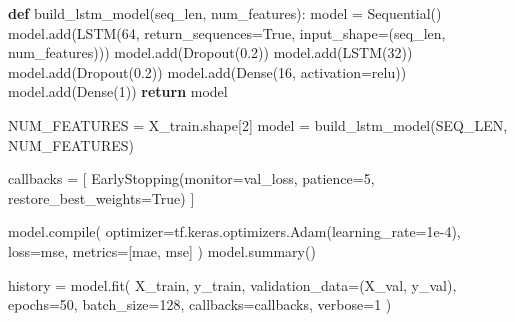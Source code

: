 \documentclass[
  letterpaper,
  DIV=11,
  numbers=noendperiod]{scrartcl}
\newenvironment{Shaded}{\begin{snugshade}}{\end{snugshade}}
\newcommand{\BuiltInTok}[1]{\textcolor[rgb]{0.00,0.23,0.31}{#1}}
\newcommand{\ControlFlowTok}[1]{\textcolor[rgb]{0.00,0.23,0.31}{\textbf{#1}}}
\newcommand{\DecValTok}[1]{\textcolor[rgb]{0.68,0.00,0.00}{#1}}
\newcommand{\FloatTok}[1]{\textcolor[rgb]{0.68,0.00,0.00}{#1}}
\newcommand{\KeywordTok}[1]{\textcolor[rgb]{0.00,0.23,0.31}{\textbf{#1}}}
\newcommand{\NormalTok}[1]{\textcolor[rgb]{0.00,0.23,0.31}{#1}}
\newcommand{\OperatorTok}[1]{\textcolor[rgb]{0.37,0.37,0.37}{#1}}
\newcommand{\StringTok}[1]{\textcolor[rgb]{0.13,0.47,0.30}{#1}}
\newcommand{\VariableTok}[1]{\textcolor[rgb]{0.07,0.07,0.07}{#1}}
\begin{document}
\begin{Shaded}
\begin{Highlighting}[]
\KeywordTok{def}\NormalTok{ build\_lstm\_model(seq\_len, num\_features):}
\NormalTok{    model }\OperatorTok{=}\NormalTok{ Sequential()}
\NormalTok{    model.add(LSTM(}\DecValTok{64}\NormalTok{, return\_sequences}\OperatorTok{=}\VariableTok{True}\NormalTok{, input\_shape}\OperatorTok{=}\NormalTok{(seq\_len, num\_features)))}
\NormalTok{    model.add(Dropout(}\FloatTok{0.2}\NormalTok{))}
\NormalTok{    model.add(LSTM(}\DecValTok{32}\NormalTok{))}
\NormalTok{    model.add(Dropout(}\FloatTok{0.2}\NormalTok{))}
\NormalTok{    model.add(Dense(}\DecValTok{16}\NormalTok{, activation}\OperatorTok{=}\StringTok{\textquotesingle{}relu\textquotesingle{}}\NormalTok{))}
\NormalTok{    model.add(Dense(}\DecValTok{1}\NormalTok{))  }
    \ControlFlowTok{return}\NormalTok{ model}

\NormalTok{NUM\_FEATURES }\OperatorTok{=}\NormalTok{ X\_train.shape[}\DecValTok{2}\NormalTok{]}
\NormalTok{model }\OperatorTok{=}\NormalTok{ build\_lstm\_model(SEQ\_LEN, NUM\_FEATURES)}

\NormalTok{callbacks }\OperatorTok{=}\NormalTok{ [}
\NormalTok{    EarlyStopping(monitor}\OperatorTok{=}\StringTok{\textquotesingle{}val\_loss\textquotesingle{}}\NormalTok{, patience}\OperatorTok{=}\DecValTok{5}\NormalTok{, restore\_best\_weights}\OperatorTok{=}\VariableTok{True}\NormalTok{)}
\NormalTok{]}

\NormalTok{model.}\BuiltInTok{compile}\NormalTok{(}
\NormalTok{    optimizer}\OperatorTok{=}\NormalTok{tf.keras.optimizers.Adam(learning\_rate}\OperatorTok{=}\FloatTok{1e{-}4}\NormalTok{),}
\NormalTok{    loss}\OperatorTok{=}\StringTok{\textquotesingle{}mse\textquotesingle{}}\NormalTok{,}
\NormalTok{    metrics}\OperatorTok{=}\NormalTok{[}\StringTok{\textquotesingle{}mae\textquotesingle{}}\NormalTok{, }\StringTok{\textquotesingle{}mse\textquotesingle{}}\NormalTok{]}
\NormalTok{)}
\NormalTok{model.summary()}
\end{Highlighting}
\end{Shaded}

\begin{Shaded}
\begin{Highlighting}[]
\NormalTok{history }\OperatorTok{=}\NormalTok{ model.fit(}
\NormalTok{    X\_train, y\_train,}
\NormalTok{    validation\_data}\OperatorTok{=}\NormalTok{(X\_val, y\_val),}
\NormalTok{    epochs}\OperatorTok{=}\DecValTok{50}\NormalTok{, }
\NormalTok{    batch\_size}\OperatorTok{=}\DecValTok{128}\NormalTok{,}
\NormalTok{    callbacks}\OperatorTok{=}\NormalTok{callbacks,}
\NormalTok{    verbose}\OperatorTok{=}\DecValTok{1}
\NormalTok{)}
\end{Highlighting}
\end{Shaded}
\end{document}
